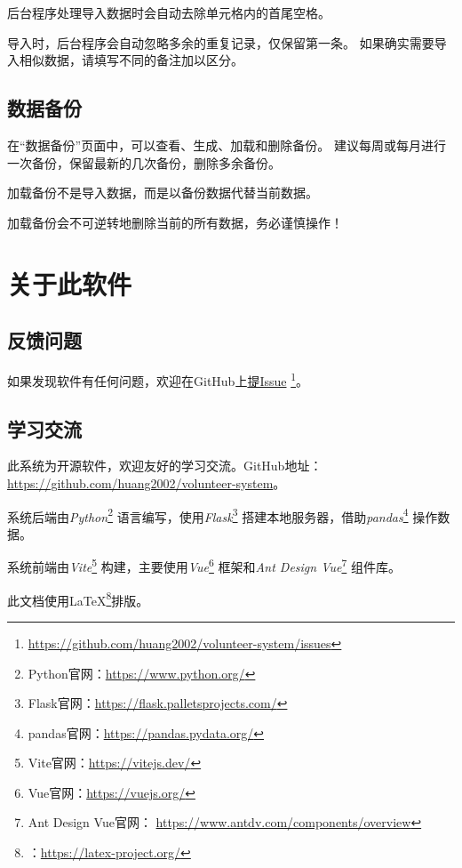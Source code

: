 \documentclass[12pt,titlepage]{article}
\newcommand{\githuburl}{https://github.com/huang2002/volunteer-system}
\newcommand{\issuesurl}{\githuburl/issues}
\newcommand{\Python}{\textit{Python}}
\begin{document}
\begin{warnings}
    \item 后台程序处理导入数据时会自动去除单元格内的首尾空格。
    \item 导入时，后台程序会自动忽略多余的重复记录，仅保留第一条。
    如果确实需要导入相似数据，请填写不同的备注加以区分。
\end{warnings}

\subsection{数据备份}

在“数据备份”页面中，可以查看、生成、加载和删除备份。
建议每周或每月进行一次备份，保留最新的几次备份，删除多余备份。

\begin{warnings}
    \item 加载备份不是导入数据，而是以备份数据代替当前数据。
    \item 加载备份会不可逆转地删除当前的所有数据，务必谨慎操作！
\end{warnings}

\newpage
\section{关于此软件}

\subsection{反馈问题}

如果发现软件有任何问题，欢迎在GitHub上\href{\issuesurl}{提Issue}
\footnote{\url{\issuesurl}}。

\subsection{学习交流}

此系统为开源软件，欢迎友好的学习交流。GitHub地址：\url{\githuburl}。

系统后端由\Python\footnote{Python官网：\url{https://www.python.org/}}
语言编写，使用\textit{Flask}\footnote{Flask官网：\url{https://flask.palletsprojects.com/}}
搭建本地服务器，借助\textit{pandas}\footnote{pandas官网：\url{https://pandas.pydata.org/}}
操作数据。

系统前端由\textit{Vite}\footnote{Vite官网：\url{https://vitejs.dev/}}
构建，主要使用\textit{Vue}\footnote{Vue官网：\url{https://vuejs.org/}}
框架和\textit{Ant Design Vue}\footnote{Ant Design Vue官网：%
    \url{https://www.antdv.com/components/overview}}
组件库。

此文档使用\LaTeX\footnote{：\url{https://latex-project.org/}}排版。
\end{document}
